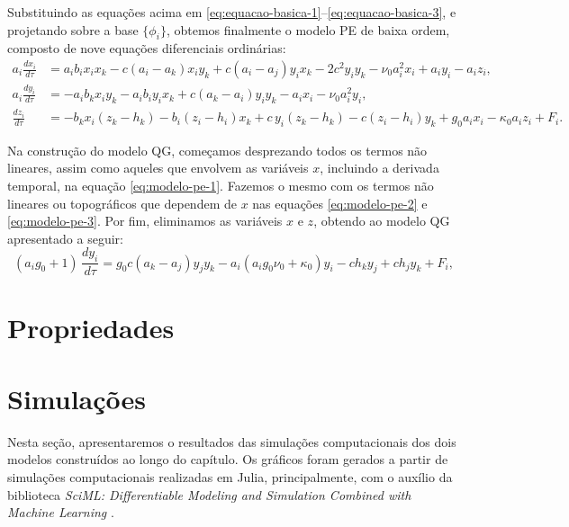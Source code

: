Substituindo as equações acima em \eqref{eq:equacao-basica-1}–\eqref{eq:equacao-basica-3}, e projetando sobre a base $\{\phi_i\}$, obtemos finalmente o modelo PE de baixa ordem, composto de nove equações diferenciais ordinárias:
\begin{align}
    a_i\frac{dx_i}{d\tau} & = a_ib_ix_ix_k - c(a_i - a_k)x_iy_k      
	+ c(a_i - a_j)y_ix_k -2c^2y_iy_k - \nu_0a_i^2x_i + a_iy_i - a_iz_i, \label{eq:modelo-pe-1}\\
	a_i\frac{dy_i}{d\tau} & = -a_ib_kx_iy_k - a_ib_iy_ix_k           
	+ c(a_k - a_i)y_iy_k - a_ix_i - \nu_0a_i^2y_i, \label{eq:modelo-pe-2}\\
	\frac{dz_i}{d\tau}    & = -b_kx_i(z_k - h_k) - b_i(z_i - h_i)x_k 
	+ c\,y_i(z_k - h_k) - c(z_i - h_i)y_k + g_0a_ix_i - \kappa_0a_iz_i + F_i. \label{eq:modelo-pe-3}
\end{align}

Na construção do modelo QG, começamos desprezando todos os termos não lineares, assim como aqueles que envolvem as variáveis $x$, incluindo a derivada temporal, na equação \eqref{eq:modelo-pe-1}. Fazemos o mesmo com os termos não lineares ou topográficos que dependem de $x$ nas equações \eqref{eq:modelo-pe-2} e \eqref{eq:modelo-pe-3}. Por fim, eliminamos as variáveis $x$ e $z$, obtendo ao modelo QG apresentado a seguir:
\begin{equation}
	(a_i g_0 + 1)\,\frac{dy_i}{d\tau} 
	= g_0 c (a_k - a_j) y_j y_k 
	- a_i (a_i g_0 \nu_0 + \kappa_0) y_i 
	- c h_k y_j + c h_j y_k + F_i,
	\label{eq:modelo_lorenz_deterministico_qg}
\end{equation}

\section{Propriedades} \label{sec:ch01_prop_do_modelo}

\section{Simulações} \label{sec:ch01_simulacoes_deterministico}
Nesta seção, apresentaremos o resultados das simulações computacionais dos dois modelos construídos ao longo do capítulo. Os gráficos foram gerados a partir de simulações computacionais realizadas em Julia, principalmente, com o auxílio da biblioteca \textit{SciML: Differentiable Modeling and Simulation Combined with Machine Learning} \citep{Rackauckas2017}.

